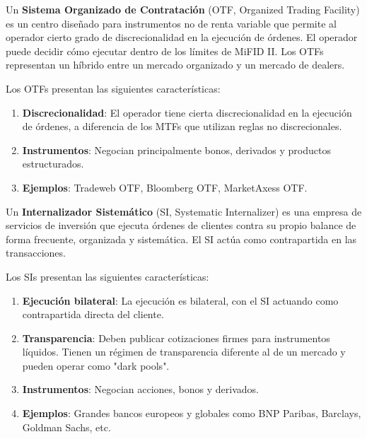 \begin{definicion}
Un \textbf{Sistema Organizado de Contratación} (OTF, Organized Trading Facility) es un centro diseñado para instrumentos no de renta variable que permite al operador cierto grado de discrecionalidad en la ejecución de órdenes. El operador puede decidir cómo ejecutar dentro de los límites de MiFID II. Los OTFs representan un híbrido entre un mercado organizado y un mercado de dealers.
\end{definicion}

\begin{teorema}
Los OTFs presentan las siguientes características:
\begin{enumerate}
\item \textbf{Discrecionalidad}: El operador tiene cierta discrecionalidad en la ejecución de órdenes, a diferencia de los MTFs que utilizan reglas no discrecionales.
\item \textbf{Instrumentos}: Negocian principalmente bonos, derivados y productos estructurados.
\item \textbf{Ejemplos}: Tradeweb OTF, Bloomberg OTF, MarketAxess OTF.
\end{enumerate}
\end{teorema}

\begin{definicion}
Un \textbf{Internalizador Sistemático} (SI, Systematic Internalizer) es una empresa de servicios de inversión que ejecuta órdenes de clientes contra su propio balance de forma frecuente, organizada y sistemática. El SI actúa como contrapartida en las transacciones.
\end{definicion}

\begin{teorema}
Los SIs presentan las siguientes características:
\begin{enumerate}
\item \textbf{Ejecución bilateral}: La ejecución es bilateral, con el SI actuando como contrapartida directa del cliente.
\item \textbf{Transparencia}: Deben publicar cotizaciones firmes para instrumentos líquidos. Tienen un régimen de transparencia diferente al de un mercado y pueden operar como "dark pools".
\item \textbf{Instrumentos}: Negocian acciones, bonos y derivados.
\item \textbf{Ejemplos}: Grandes bancos europeos y globales como BNP Paribas, Barclays, Goldman Sachs, etc.
\end{enumerate}
\end{teorema}

